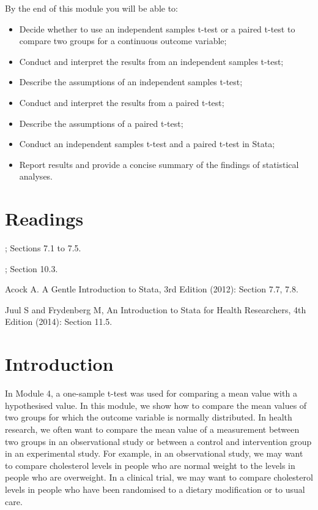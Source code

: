 \documentclass[
]{memoir}
\providecommand{\tightlist}{%
  \setlength{\itemsep}{0pt}\setlength{\parskip}{0pt}}
\begin{document}
By the end of this module you will be able to:

\begin{itemize}
\tightlist
\item
  Decide whether to use an independent samples t-test or a paired t-test to compare two groups for a continuous outcome variable;
\item
  Conduct and interpret the results from an independent samples t-test;
\item
  Describe the assumptions of an independent samples t-test;
\item
  Conduct and interpret the results from a paired t-test;
\item
  Describe the assumptions of a paired t-test;
\item
  Conduct an independent samples t-test and a paired t-test in Stata;
\item
  Report results and provide a concise summary of the findings of statistical analyses.
\end{itemize}

\hypertarget{readings-4}{%
\section*{Readings}\label{readings-4}}

\citep{kirkwood_sterne01}; Sections 7.1 to 7.5.

\citep{bland15}; Section 10.3.

Acock A. A Gentle Introduction to Stata, 3rd Edition (2012): Section 7.7, 7.8.

Juul S and Frydenberg M, An Introduction to Stata for Health Researchers, 4th Edition (2014): Section 11.5.

\hypertarget{introduction-2}{%
\section{Introduction}\label{introduction-2}}

In Module 4, a one-sample t-test was used for comparing a mean value with a hypothesised value. In this module, we show how to compare the mean values of two groups for which the outcome variable is normally distributed. In health research, we often want to compare the mean value of a measurement between two groups in an observational study or between a control and intervention group in an experimental study. For example, in an observational study, we may want to compare cholesterol levels in people who are normal weight to the levels in people who are overweight. In a clinical trial, we may want to compare cholesterol levels in people who have been randomised to a dietary modification or to usual care.
\end{document}
